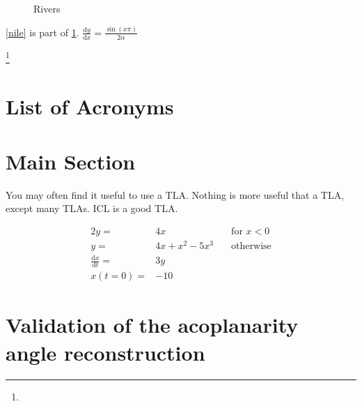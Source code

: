 \documentclass[11pt, a4paper, twoside]{report}
\newcommand{\hardmaths} {\frac{\sin{(x\pi)}} {2\alpha}}
\newcommand{\diff}[2]  {\frac{\textrm{d}{#1}} {\textrm{d}{#2}}}
\begin{document}
\begin{figure}
\caption{Rivers}\label{rivers}
\end{figure}

\ref{nile} is part of \ref{rivers}.
\clearpage
$\diff{y}{x}=\hardmaths$

\clearpage
\blindtext
\begin{singlespace}
\blindtext
\end{singlespace}
\blindtext\footnote{\blindtext}
\clearpage
\section{List of Acronyms}
\begin{acronym}
\end{acronym}

\section{Main Section}
You may often find it useful to use a \ac{TLA}. Nothing is more useful that a \ac{TLA}, except many \acp{TLA}. \ac{ICL} is a good \ac{TLA}.

\begin{alignat}{2}
y=&4x \quad & \textrm{for } x < 0\\
y=&4x+x^{2}-5x^{3} \quad & \textrm{otherwise}\\
\diff{x}{t}=& 3y\\
x(t=0)=&-10
\end{alignat}

\section{Validation of the acoplanarity angle reconstruction}



\end{document}
